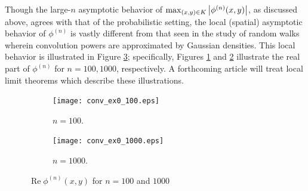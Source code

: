 \documentclass[11pt]{article}
\newenvironment{example}
  {\pushQED{\qed}\renewcommand{\qedsymbol}{$\triangle$}\examplex}
  {\popQED\endexamplex}
\theoremstyle{remark}
\renewcommand\Re{\operatorname{Re}}%
\begin{document}
\begin{example}
\noindent Though the large-$n$ asymptotic behavior of $\max_{(x,y)\in K}\abs{\phi^{(n)}(x,y)}$, as discussed above, agrees with that of the probabilistic setting, the local (spatial) asymptotic behavior of $\phi^{(n)}$ is vastly different from that seen in the study of random walks wherein convolution powers are approximated by Gaussian densities. This local behavior is illustrated in Figure \ref{fig:Conv_Pwr_00}; specifically, Figures \ref{fig:Conv_Pwr_00a} and \ref{fig:Conv_Pwr_00b} illustrate the real part of $\phi^{(n)}$ for $n = 100, 1000$, respectively. A forthcoming article will treat local limit theorems which describe these illustrations. 

\begin{figure}[!htb]
    \begin{subfigure}{0.49\textwidth}
    \centering
    \texttt{[image: conv\_ex0\_100.eps]}
    \caption{$n = 100$.}
    \label{fig:Conv_Pwr_00a}
    \end{subfigure}
    \begin{subfigure}{0.49\textwidth}
    \centering
    \texttt{[image: conv\_ex0\_1000.eps]}
    \caption{$n = 1000$.}
    \label{fig:Conv_Pwr_00b}
    \end{subfigure}
    \caption{$\Re\phi^{(n)}(x,y)$ for $n=100$ and $1000$}
    \label{fig:Conv_Pwr_00}
\end{figure}
\end{example}
\end{document}

